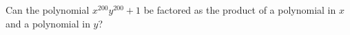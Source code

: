 Can the polynomial $x^{200} y^{200} + 1$ be factored as the product of a polynomial in $x$ and a polynomial in $y$?
